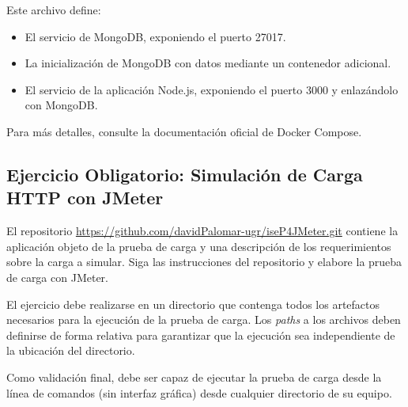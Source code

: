 Este archivo define:
\begin{itemize}
    \item El servicio de MongoDB, exponiendo el puerto 27017.
    \item La inicialización de MongoDB con datos mediante un contenedor adicional.
    \item El servicio de la aplicación Node.js, exponiendo el puerto 3000 y enlazándolo con MongoDB.
\end{itemize}

Para más detalles, consulte la documentación oficial de Docker Compose.

\subsection*{Ejercicio Obligatorio: Simulación de Carga HTTP con JMeter}

El repositorio \url{https://github.com/davidPalomar-ugr/iseP4JMeter.git} contiene la aplicación objeto de la prueba de carga y una descripción de los requerimientos sobre la carga a simular. Siga las instrucciones del repositorio y elabore la prueba de carga con JMeter.

El ejercicio debe realizarse en un directorio que contenga todos los artefactos necesarios para la ejecución de la prueba de carga. Los \textit{paths} a los archivos deben definirse de forma relativa para garantizar que la ejecución sea independiente de la ubicación del directorio. 

Como validación final, debe ser capaz de ejecutar la prueba de carga desde la línea de comandos (sin interfaz gráfica) desde cualquier directorio de su equipo.